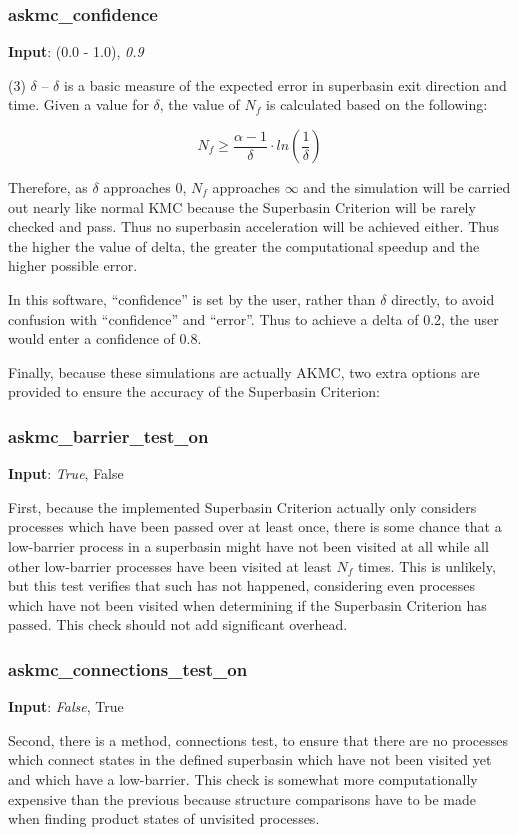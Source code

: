 \documentclass{article}
\begin{document}
\subsubsection{askmc\_confidence}

\noindent\textbf{Input}:  (0.0 - 1.0), \emph{0.9}

(3) $\delta$ -- $\delta$ is a basic measure of the expected error in superbasin exit direction and time.  Given a value for $\delta$, the value of $N_f$ is calculated based on the following:

\begin{equation}
N_f \ge \frac{\alpha - 1}{\delta} \cdot ln(\frac{1}{\delta}) \nonumber
\end{equation}

Therefore, as $\delta$ approaches $0$, $N_f$ approaches $\infty$ and the simulation will be carried out nearly like normal KMC because the Superbasin Criterion will be rarely checked and pass.  Thus no superbasin acceleration will be achieved either.  Thus the higher the value of delta, the greater the computational speedup and the higher possible error.

In this software, ``confidence'' is set by the user, rather than $\delta$ directly, to avoid confusion with ``confidence'' and ``error''.  Thus to achieve a delta of 0.2, the user would enter a confidence of 0.8.

Finally, because these simulations are actually AKMC, two extra options are provided to ensure the accuracy of the Superbasin Criterion:

\subsubsection{askmc\_barrier\_test\_on}

\noindent\textbf{Input}:  \emph{True}, False

First, because the implemented Superbasin Criterion actually only considers processes which have been passed over at least once, there is some chance that a low-barrier process in a superbasin might have not been visited at all while all other low-barrier processes have been visited at least $N_f$ times.  This is unlikely, but this test verifies that such has not happened, considering even processes which have not been visited when determining if the Superbasin Criterion has passed.  This check should not add significant overhead.

\subsubsection{askmc\_connections\_test\_on}

\noindent\textbf{Input}:  \emph{False}, True

Second, there is a method, connections test, to ensure that there are no processes which connect states in the defined superbasin which have not been visited yet and which have a low-barrier.  This check is somewhat more computationally expensive than the previous because structure comparisons have to be made when finding product states of unvisited processes.
\end{document}
